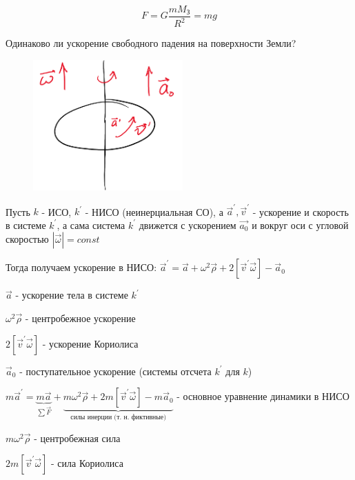 \documentclass[12pt]{article}
\begin{document}
    \[F = G\frac{mM_{\text{З}}}{R^2} = mg\]

    Одинаково ли ускорение свободного падения на поверхности Земли? %

    \smallvspace

    \begin{minipage}{\textwidth}
        \begin{figure}
            \includegraphics[height=5cm]{physics1/images/physics1_2024_09_30_1}
        \end{figure}

        Пусть $k$ - ИСО, $k^\prime$ - НИСО (неинерциальная СО), а $\vec{a}^\prime, \vec{v}^\prime$ - ускорение и скорость в системе $k^\prime$,
        а сама система $k^\prime$ движется с ускорением $\vec{a_0}$ и вокруг оси с угловой скоростью $|\vec{\omega}| = const$


        Тогда получаем ускорение в НИСО: $\vec{a}^\prime = \vec{a} + \omega^2 \vec{\rho} + 2 [\vec{v}^\prime \vec{\omega}] - \vec{a}_0$

        $\vec{a}$ - ускорение тела в системе $k^\prime$

        $\omega^2 \vec{\rho}$ - центробежное ускорение

    \end{minipage}

    \smallvspace

    $2 [\vec{v}^\prime \vec{\omega}]$ - ускорение Кориолиса

    $\vec{a}_0$ - поступательное ускорение (системы отсчета $k^\prime$ для $k$)

    $m\vec{a}^\prime = \underset{\sum \vec{F}}{\underbrace{m\vec{a}}} + \underset{\text{силы инерции (т. н. фиктивные)}}{\underbrace{m\omega^2 \vec{\rho} + 2m [\vec{v}^\prime \vec{\omega}] - m\vec{a}_0}}$ - основное уравнение динамики в НИСО

    $m \omega^2 \vec{\rho}$ - центробежная сила

    $2m [\vec{v}^\prime \vec{\omega}]$ - сила Кориолиса
\end{document}
